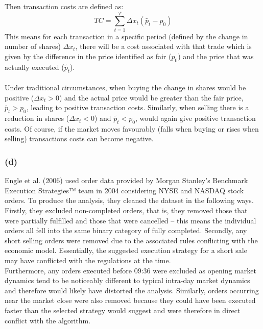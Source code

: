 \documentclass{article}
\begin{document}
Then transaction costs are defined as:
\begin{equation}
    TC = \sum_{t=1}^{T} \Delta x_t ( \tilde{p_t} - p_0 )
\end{equation}
This means for each transaction in a specific period (defined by the change in number of shares) $\Delta x_t$, there will be a cost associated with that trade which is given by the difference in the price identified as fair ($p_0$) and the price that was actually executed ($\tilde{p_t}$). \\ 
\\ Under traditional circumstances, when buying the change in shares would be positive ($ \Delta x_t > 0 $) and the actual price would be greater than the fair price, $ \tilde{p_t} > p_0 $, leading to positive transaction costs. Similarly, when selling there is a reduction in shares ($ \Delta x_t < 0$) and $ \tilde{p_t} < p_0 $, would again give positive transaction costs. Of course, if the market moves favourably (falls when buying or rises when selling) transactions costs can become negative. \\ 

\newpage
\subsubsection*{(d)}
Engle et al. (2006) used order data provided by Morgan Stanley’s Benchmark Execution Strategies™ team in 2004 considering NYSE and NASDAQ stock orders. To produce the analysis, they cleaned the dataset in the following ways. \\

Firstly, they excluded non-completed orders, that is, they removed those that were partially fulfilled and those that were cancelled – this means the individual orders all fell into the same binary category of fully completed. Secondly, any short selling orders were removed due to the associated rules conflicting with the economic model. Essentially, the suggested execution strategy for a short sale may have conflicted with the regulations at the time. \\

Furthermore, any orders executed before 09:36 were excluded as opening market dynamics tend to be noticeably different to typical intra-day market dynamics and therefore would likely have distorted the analysis. Similarly, orders occurring near the market close were also removed because they could have been executed faster than the selected strategy would suggest and were therefore in direct conflict with the algorithm. \\
\end{document}
